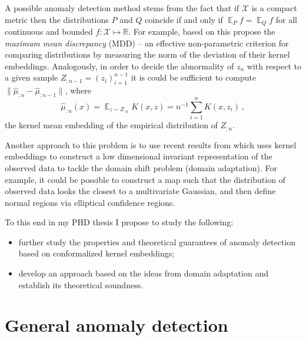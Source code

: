 \documentclass{extarticle}
\newcommand{\ex}{\mathop{\mathbb{E}}\nolimits}
\newcommand{\Xcal}{\mathcal{X}}
\newcommand{\Real}{\mathbb{R}}
\begin{document}
A possible anomaly detection method stems from the fact that if $\Xcal$ is a compact
metric then the distributions $P$ and $Q$ coincide if and only if $\ex_P f = \ex_Q f$
for all continuous and bounded $f:\Xcal\mapsto \Real$. For example, based on this
\cite{gretton2012} propose the \textit{maximum mean discrepancy} (MDD) -- an effective
non-parametric criterion for comparing distributions by measuring the norm of the
deviation of their kernel embeddings. Analogously, in order to decide the abnormality
of $z_n$ with respect to a given sample $Z_{:n-1} = (z_i)_{i=1}^{n-1}$ it is could
be sufficient to compute $\|\hat{\mu}_{:n} - \hat{\mu}_{:n-1}\|$, where
\begin{equation*}
  \hat{\mu}_{:n}(x) = \ex_{z\sim Z_{:n}} K(x, z) = n^{-1} \sum_{i=1}^n K(x, z_i) \,,
\end{equation*}
the kernel mean embedding of the empirical distribution of $Z_{:n}$.

Another approach to this problem is to use recent results from \cite{Baktashmotlaghetal2016}
which uses kernel embeddings to construct a low dimensional invariant representation
of the observed data to tackle the domain shift problem (domain adaptation). For
example, it could be possible to construct a map such that the distribution of observed
data looks the closest to a multivariate Gaussian, and then define normal regions
via elliptical confidence regions.

To this end in my PHD thesis I propose to study the following: \begin{itemize}
  \item further study the properties and theoretical guarantees of anomaly detection
  based on conformalized kernel embeddings;
  \item develop an approach based on the ideas from domain adaptation and establish
  its theoretical soundness.
\end{itemize}


\section{General anomaly detection} %
\label{sec:general_anomaly_detection}

\end{document}
